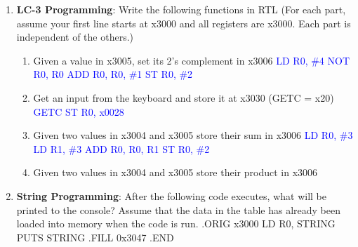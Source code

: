 \documentclass{article}
\begin{document}
\begin{enumerate}[label=(\alph*)]
\begin{enumerate}[label=(\alph*)]
\begin{enumerate}[label=(\roman*),itemsep = 10pt]
        \end{enumerate}
        \item \textbf{LC-3 Programming}: Write the following functions in RTL (For each part, assume your first line starts at x3000 and all registers are x3000. Each part is independent of the others.)
        \begin{enumerate}[label=(\roman*),itemsep = 10pt]
            \item Given a value in x3005, set its 2’s complement in x3006
            \newline \textcolor{blue}{LD R0, \#4}
            \newline \textcolor{blue}{NOT R0, R0}
            \newline \textcolor{blue}{ADD R0, R0, \#1}
            \newline \textcolor{blue}{ST R0, \#2}
            \item Get an input from the keyboard and store it at x3030 (GETC = x20)
            \newline \textcolor{blue}{GETC}
            \newline \textcolor{blue}{ST R0, x0028}
            \item Given two values in x3004 and x3005 store their sum in x3006
            \newline \textcolor{blue}{LD R0, \#3}
            \newline \textcolor{blue}{LD R1, \#3}
            \newline \textcolor{blue}{ADD R0, R0, R1}
            \newline \textcolor{blue}{ST R0, \#2}
            \item Given two values in x3004 and x3005 store their product in x3006
        \end{enumerate}
        \item \textbf{String Programming}: After the following code executes, what will be printed to the console? Assume that the data in the table has already been loaded into memory when the code is run.
        \newline
        \newline
        .ORIG x3000
        \newline
        LD R0, STRING
        \newline
        PUTS
        \newline
        STRING
        \newline
        	.FILL 0x3047
        \newline
        .END

\end{enumerate}
\end{enumerate}
\end{document}
